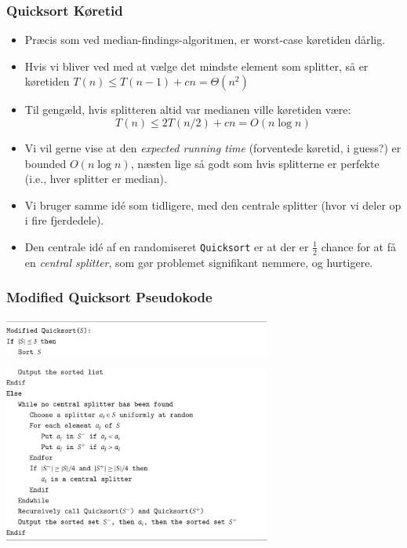 \documentclass{beamer}
\begin{document}
\begin{frame}[allowframebreaks]
  \frametitle{Quicksort Køretid}
  \begin{itemize}
  \item Præcis som ved median-findings-algoritmen, er worst-case køretiden dårlig. 
  \item Hvis vi bliver ved med at vælge det mindste element som splitter, så er køretiden $T(n) \leq T(n-1) + cn = \Theta (n^{2})$
  \item Til gengæld, hvis splitteren altid var medianen ville køretiden være: \[T(n)  \leq 2T(n/2) + cn= O(n \log n)\]
  \item Vi vil gerne vise at den \textit{expected running time} (forventede køretid, i guess?) er bounded $O(n \log n)$, næsten lige så godt som hvis splitterne er perfekte (i.e., hver splitter er median).
  \item Vi bruger samme idé som tidligere, med den centrale splitter (hvor vi deler op i fire fjerdedele).
  \item Den centrale idé af en randomiseret \texttt{Quicksort} er at der er $\frac{1}{2}$ chance for at få en \textit{central splitter}, som gør problemet signifikant nemmere, og hurtigere.
\end{itemize}
\end{frame}

\begin{frame}
  \frametitle{Modified Quicksort Pseudokode}
  
\begin{center}

\includegraphics[width=250pt]{main--randomized-divide-and-conquer-median-finding-and-quicksort--finding-the-median-0ca4.png}

\includegraphics[width=250pt]{main--randomized-divide-and-conquer-median-finding-and-quicksort--finding-the-median-0f82.png}
\end{center}
\end{frame}
\end{document}
